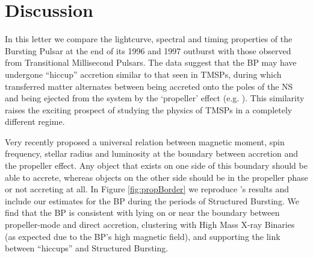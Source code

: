 \vspace{-2em} %

%
%
%
%


\section{Discussion}

\par In this letter we compare the lightcurve, spectral and timing properties of the Bursting Pulsar at the end of its 1996 and 1997 outburst with those observed from Transitional Millisecond Pulsars. The data suggest that the BP may have undergone ``hiccup'' accretion similar to that seen in TMSPs, during which transferred matter alternates between being accreted onto the poles of the NS and being ejected from the system by the `propeller' effect (e.g. \citealp{Ferrigno_TMSPVar}). This similarity raises the exciting prospect of studying the physics of TMSPs in a completely different regime.

%
%

\par Very recently \citealp{Campana_PropBorder} proposed a universal relation between magnetic moment, spin frequency, stellar radius and luminosity at the boundary between accretion and the propeller effect. Any object that exists on one side of this boundary should be able to accrete, whereas objects on the other side should be in the propeller phase or not accreting at all. In Figure \ref{fig:propBorder} we reproduce \citealp{Campana_PropBorder}'s results and include our estimates for the BP during the periods of Structured Bursting. We find that the BP is consistent with lying on or near the boundary between propeller-mode and direct accretion, clustering with High Mass X-ray Binaries (as expected due to the BP's high magnetic field), and supporting the link between ``hiccups'' and Structured Bursting.


